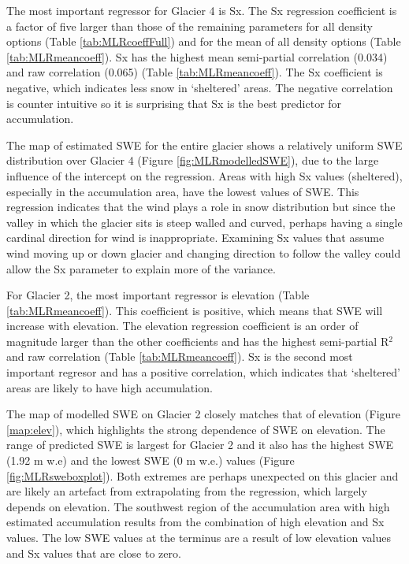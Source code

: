 \documentclass{sfuthesis}
\begin{document}
The most important regressor for Glacier 4 is Sx. The Sx regression coefficient is a factor of five larger than those of the remaining parameters for all density options (Table \ref{tab:MLRcoeffFull}) and for the mean of all density options (Table \ref{tab:MLRmeancoeff}). Sx has the highest mean semi-partial correlation (0.034)  and raw correlation (0.065) (Table \ref{tab:MLRmeancoeff}). The Sx coefficient is negative, which indicates less snow in `sheltered' areas. The negative correlation is counter intuitive so it is surprising that Sx is the best predictor for accumulation.

The map of estimated SWE for the entire glacier shows a relatively uniform SWE distribution over Glacier 4 (Figure \ref{fig:MLRmodelledSWE}), due to the large influence of the intercept on the regression. Areas with high Sx values (sheltered), especially in the accumulation area, have the lowest values of SWE. This regression indicates that the wind plays a role in snow distribution but since the valley in which the glacier sits is steep walled and curved, perhaps having a single cardinal direction for wind is inappropriate. Examining Sx values that assume wind moving up or down glacier and changing direction to follow the valley could allow the Sx parameter to explain more of the variance. 

For Glacier 2, the most important regressor is elevation (Table \ref{tab:MLRmeancoeff}). This coefficient is positive, which means that SWE will increase with elevation. The elevation regression coefficient is an order of magnitude larger than the other coefficients and has the highest semi-partial R$^2$ and raw correlation (Table \ref{tab:MLRmeancoeff}). Sx is the second most important regresor and has a positive correlation, which indicates that `sheltered' areas are likely to have high accumulation. 

The map of modelled SWE on Glacier 2 closely matches that of elevation (Figure \ref{map:elev}), which highlights the strong dependence of SWE on elevation. The range of predicted SWE is largest for Glacier 2 and it also has the highest SWE (1.92 m w.e) and the lowest SWE (0 m w.e.) values (Figure \ref{fig:MLRsweboxplot}). Both extremes are perhaps unexpected on this glacier and are likely an artefact from extrapolating from the regression, which largely depends on elevation. The southwest region of the accumulation area with high estimated accumulation results from the combination of high elevation and Sx values. The low SWE values at the terminus are a result of low elevation values and Sx values that are close to zero. 
\end{document}
